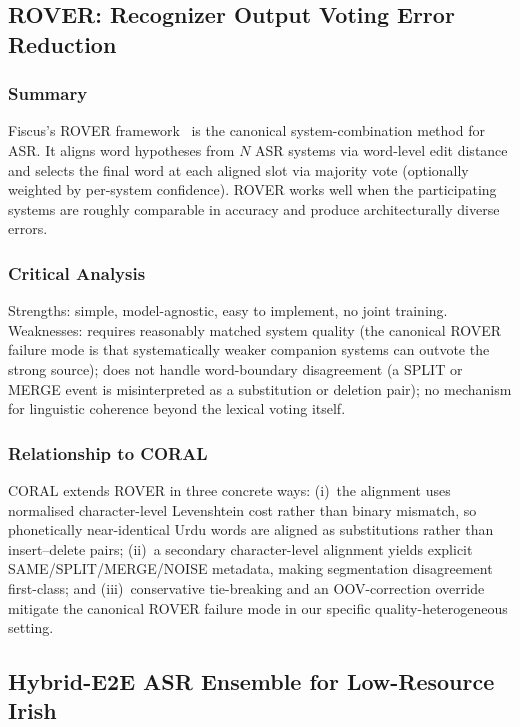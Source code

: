 \subsection{ROVER: Recognizer Output Voting Error Reduction}
\label{ssec:lit-rover}

\subsubsection{Summary}
Fiscus's ROVER framework~\cite{fiscus1997rover} is the canonical system-combination method for ASR. It aligns word hypotheses from $N$ ASR systems via word-level edit distance and selects the final word at each aligned slot via majority vote (optionally weighted by per-system confidence). ROVER works well when the participating systems are roughly comparable in accuracy and produce architecturally diverse errors.

\subsubsection{Critical Analysis}
Strengths: simple, model-agnostic, easy to implement, no joint training. Weaknesses: requires reasonably matched system quality (the canonical ROVER failure mode is that systematically weaker companion systems can outvote the strong source); does not handle word-boundary disagreement (a SPLIT or MERGE event is misinterpreted as a substitution or deletion pair); no mechanism for linguistic coherence beyond the lexical voting itself.

\subsubsection{Relationship to CORAL}
CORAL extends ROVER in three concrete ways: (i)~the alignment uses normalised character-level Levenshtein cost rather than binary mismatch, so phonetically near-identical Urdu words are aligned as substitutions rather than insert--delete pairs; (ii)~a secondary character-level alignment yields explicit SAME/SPLIT/MERGE/NOISE metadata, making segmentation disagreement first-class; and (iii)~conservative tie-breaking and an OOV-correction override mitigate the canonical ROVER failure mode in our specific quality-heterogeneous setting.

\subsection{Hybrid-E2E ASR Ensemble for Low-Resource Irish}
\label{ssec:lit-parikh}

